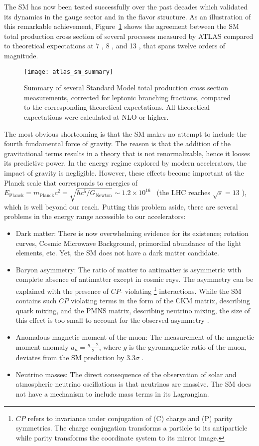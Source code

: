 The SM has now been tested successfully over the past decades which validated its dynamics in the gauge sector and in the flavor structure.
As an illustration of this remarkable achievement, Figure~\ref{fig:theory.sm.summary} shows the agreement between the SM total production cross section
of several processes measured by ATLAS compared to theoretical expectations at 7 \TeV, 8 \TeV, and 13 \TeV, that spans twelve orders of magnitude.
\begin{figure}[htb!]
\centering
\texttt{[image: atlas\_sm\_summary]}
\caption{Summary of several Standard Model total production cross section measurements, corrected for leptonic branching fractions, compared to the corresponding theoretical expectations. All theoretical expectations were calculated at NLO or higher.}
\label{fig:theory.sm.summary}
\end{figure} 
The most obvious shortcoming is that the SM makes no attempt to include the fourth fundamental force of gravity. 
The reason is that the addition of the gravitational terms results in a theory that is not renormalizable, hence 
it looses its predictive power.
In the energy regime explored by modern accelerators, the impact of gravity is negligible. 
However, these effects become important at the Planck scale that corresponds to energies of 
$E_\text{Planck} = m_\text{Planck} c^2 = \sqrt{\hbar c^5/G_\text{Newton}} \sim 1.2 \times 10^{16}$ \TeV~(the LHC reaches $\sqrt{s}=13$ \TeV), 
which is well beyond our reach. 
Putting this problem aside, there are several problems in the energy range accessible to our accelerators:
\begin{itemize}
\item Dark matter: There is now overwhelming evidence for its existence; rotation curves, Cosmic Microwave Background, primordial abundance of the light elements, etc. 
Yet, the SM does not have a dark matter candidate\cite{Bertone:2004pz}.
\item Baryon asymmetry: The ratio of matter to antimatter is asymmetric with complete absence of antimatter except in cosmic rays.
The asymmetry can be explained with the presence of $CP$-
violating
\footnote{$CP$ refers to invariance under conjugation of (C) charge and (P) parity symmetries. 
The charge conjugation transforms a particle to its antiparticle while parity transforms the coordinate system to its mirror image.}
interactions. While the SM contains such $CP$ violating terms in the form of the CKM matrix, describing  quark mixing, and the PMNS matrix, describing neutrino 
mixing, the size of this effect is too small to account for the observed asymmetry \cite{Canetti:2012zc}.
\item Anomalous magnetic moment of the muon: The measurement of the magnetic moment anomaly $a_\mu = \frac{g-2}{2}$, where $g$ is the gyromagnetic ratio of the muon, 
deviates from the SM prediction by 3.3$\sigma$ \cite{PhysRevD.73.072003,Hagiwara:2011af}.
\item Neutrino masses: The direct consequence of the observation of solar and atmospheric neutrino oscillations is that neutrinos are massive. The SM does not have a mechanism to include 
mass terms in its Lagrangian\cite{pdg}.
\end{itemize}
